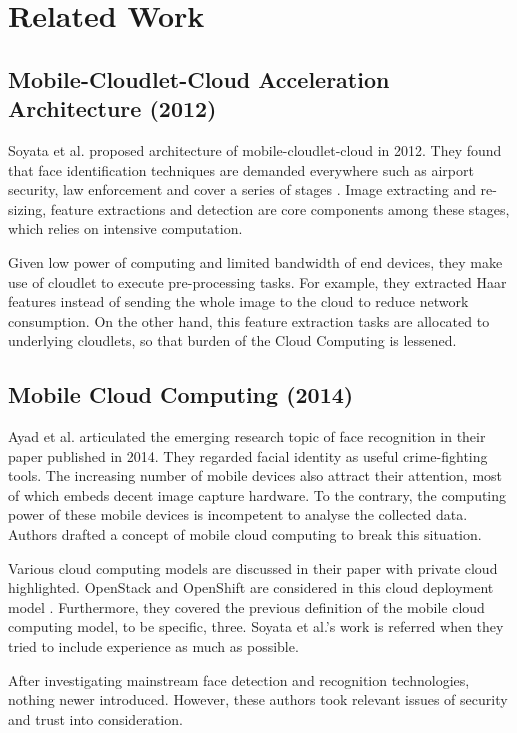 \chapter{Related Work} \label{chap:relatedwork}


\section{Mobile-Cloudlet-Cloud Acceleration Architecture (2012)}

Soyata et al. proposed architecture of mobile-cloudlet-cloud in 2012. They found that face identification techniques are demanded everywhere such as airport security, law enforcement and cover a series of stages \cite{soyata2012cloud}. Image extracting and re-sizing, feature extractions and detection are core components among these stages, which relies on intensive computation.

Given low power of computing and limited bandwidth of end devices, they make use of cloudlet to execute pre-processing tasks. For example, they extracted Haar features instead of sending the whole image to the cloud to reduce network consumption. On the other hand, this feature extraction tasks are allocated to underlying cloudlets, so that burden of the Cloud Computing is lessened.

\section{Mobile Cloud Computing (2014)}

Ayad et al. articulated the emerging research topic of face recognition in their paper published in 2014. They regarded facial identity as useful crime-fighting tools. The increasing number of mobile devices also attract their attention, most of which embeds decent image capture hardware. To the contrary, the computing power of these mobile devices is incompetent to analyse the collected data. Authors drafted a concept of mobile cloud computing to break this situation. 

Various cloud computing models are discussed in their paper with private cloud highlighted. OpenStack and OpenShift are considered in this cloud deployment model \cite{ayad2014real}. Furthermore, they covered the previous definition of the mobile cloud computing model, to be specific, three. Soyata et al.'s work is referred when they tried to include experience as much as possible.

After investigating mainstream face detection and recognition technologies, nothing newer introduced. However, these authors took relevant issues of security and trust into consideration.

